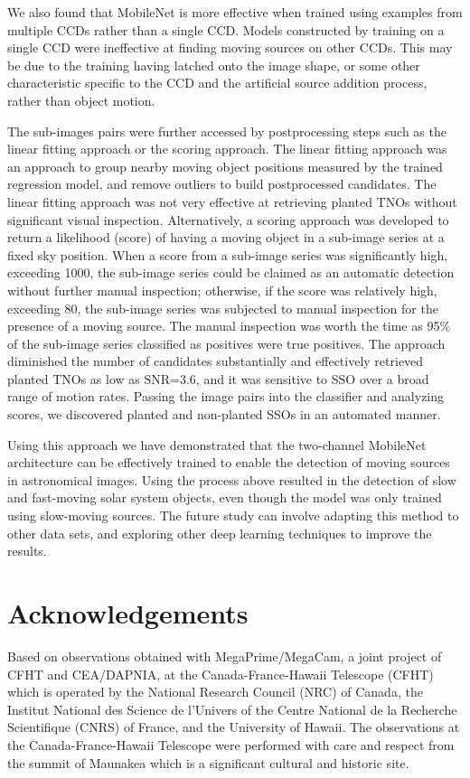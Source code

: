 We also found that MobileNet is more effective when trained using examples from multiple CCDs rather than a single CCD.
Models constructed by training on a single CCD were ineffective at finding moving sources on other CCDs.
This may be due to the training having latched onto the image shape, or some other characteristic specific to the CCD and the artificial source addition process, rather than object motion.

The sub-images pairs were further accessed by postprocessing steps such as the linear fitting approach or the scoring approach.
The linear fitting approach was an approach to group nearby moving object positions measured by the trained regression model, and remove outliers to build postprocessed candidates.
The linear fitting approach was not very effective at retrieving planted TNOs without significant visual inspection.
Alternatively, a scoring approach was developed to return a likelihood (score) of having a moving object in a sub-image series at a fixed sky position.
When a score from a sub-image series was significantly high, exceeding 1000, the sub-image series could be claimed as an automatic detection without further manual inspection; otherwise, if the score was relatively high, exceeding 80, the sub-image series was subjected to manual inspection for the presence of a moving source.
The manual inspection was worth the time as 95\% of the sub-image series classified as positives were true positives.
The approach diminished the number of candidates substantially and effectively retrieved planted TNOs as low as SNR=3.6, and it was sensitive to SSO over a broad range of motion rates.
Passing the image pairs into the classifier and analyzing scores, we discovered planted and non-planted SSOs in an automated manner.

Using this approach we have demonstrated that the two-channel MobileNet architecture can be effectively trained to enable the detection of moving sources in astronomical images.
Using the process above resulted in the detection of slow and fast-moving solar system objects, even though the model was only trained using slow-moving sources.
The future study can involve adapting this method to other data sets, and exploring other deep learning techniques to improve the results.

\section{Acknowledgements}

Based on observations obtained with MegaPrime/MegaCam, a joint project of CFHT and CEA/DAPNIA, at the Canada-France-Hawaii Telescope (CFHT) which is operated by the National Research Council (NRC) of Canada, the Institut National des Science de l'Univers of the Centre National de la Recherche Scientifique (CNRS) of France, and the University of Hawaii. The observations at the Canada-France-Hawaii Telescope were performed with care and respect from the summit of Maunakea which is a significant cultural and historic site.

